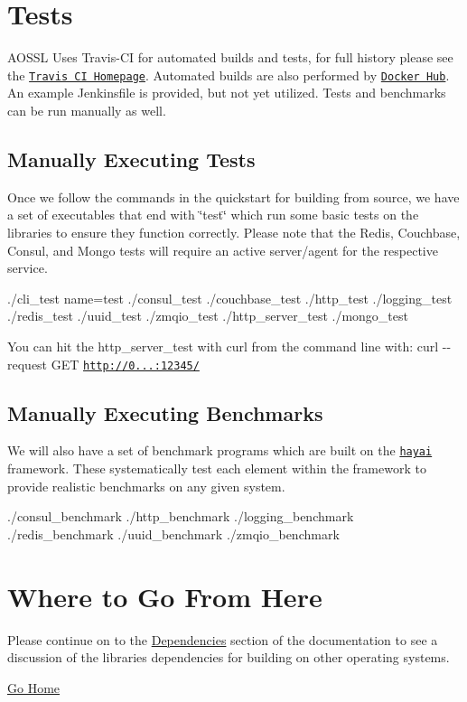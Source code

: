 \section*{Tests}

A\+O\+S\+SL Uses Travis-\/\+CI for automated builds and tests, for full history please see the \href{https://travis-ci.org/AO-StreetArt/AOSharedServiceLibrary}{\tt Travis CI Homepage}. Automated builds are also performed by \href{https://hub.docker.com/r/aostreetart/ao-services}{\tt Docker Hub}. An example Jenkinsfile is provided, but not yet utilized. Tests and benchmarks can be run manually as well.

\subsection*{Manually Executing Tests}

Once we follow the commands in the quickstart for building from source, we have a set of executables that end with \char`\"{}test\char`\"{} which run some basic tests on the libraries to ensure they function correctly. Please note that the Redis, Couchbase, Consul, and Mongo tests will require an active server/agent for the respective service. \begin{DoxyVerb}./cli_test name=test
./consul_test
./couchbase_test
./http_test
./logging_test
./redis_test
./uuid_test
./zmqio_test
./http_server_test
./mongo_test
\end{DoxyVerb}


You can hit the http\+\_\+server\+\_\+test with curl from the command line with\+: {\ttfamily curl -\/-\/request G\+ET \textquotesingle{}\href{http://0.0.0.0:12345/'}{\tt http\+://0...\+:12345/\textquotesingle{}}}

\subsection*{Manually Executing Benchmarks}

We will also have a set of benchmark programs which are built on the \href{https://github.com/nickbruun/hayai}{\tt hayai} framework. These systematically test each element within the framework to provide realistic benchmarks on any given system. \begin{DoxyVerb}./consul_benchmark
./http_benchmark
./logging_benchmark
./redis_benchmark
./uuid_benchmark
./zmqio_benchmark
\end{DoxyVerb}


\section*{Where to Go From Here}

Please continue on to the \hyperlink{dependencies}{Dependencies} section of the documentation to see a discussion of the libraries dependencies for building on other operating systems.

\hyperlink{index}{Go Home} 